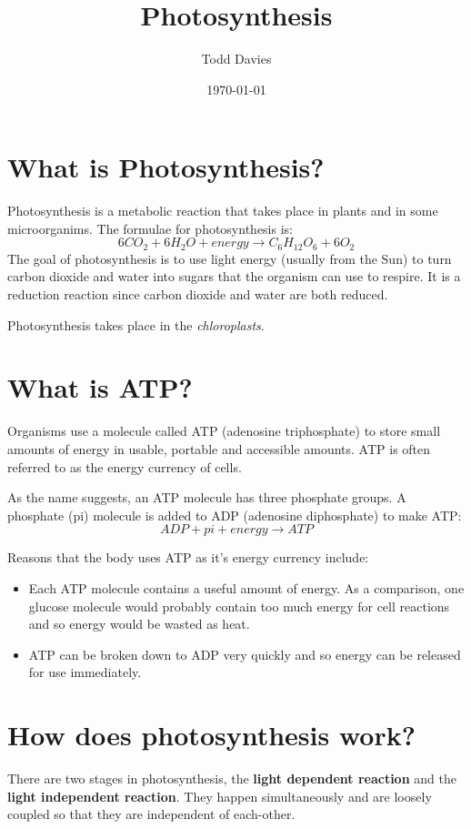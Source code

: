 \documentclass{article}
\title{Photosynthesis}
\author{Todd Davies}
\date{\today}
\begin{document}
\lhead{\today}

\maketitle

\section*{What is Photosynthesis?}
\thispagestyle{empty}
Photosynthesis is a metabolic reaction that takes place in plants and in some microorganims. The formulae for photosynthesis is:
\[
	6CO_2 + 6H_2O + energy \rightarrow C_6H_{12}O_6 + 6O_2
\]
The goal of photosynthesis is to use light energy (usually from the Sun) to turn carbon dioxide and water into sugars that the organism can use to respire. It is a reduction reaction since carbon dioxide and water are both reduced.

Photosynthesis takes place in the \textit{chloroplasts}.
\section*{What is ATP?}
Organisms use a molecule called ATP (adenosine triphosphate) to store small amounts of energy in usable, portable and accessible amounts. ATP is often referred to as the energy currency of cells. 

As the name suggests, an ATP molecule has three phosphate groups. A phosphate (pi) molecule is added to ADP (adenosine diphosphate) to make ATP:
\[
	ADP + pi + energy \rightarrow ATP
\]

Reasons that the body uses ATP as it's energy currency include:
\begin{itemize}
	\item Each ATP molecule contains a useful amount of energy. As a comparison, one glucose molecule would probably contain too much energy for cell reactions and so energy would be wasted as heat.
	\item ATP can be broken down to ADP very quickly and so energy can be released for use immediately.
\end{itemize}

\section*{How does photosynthesis work?}
There are two stages in photosynthesis, the \textbf{light dependent reaction} and the \textbf{light independent reaction}. They happen simultaneously and are loosely coupled so that they are independent of each-other.
\end{document}
